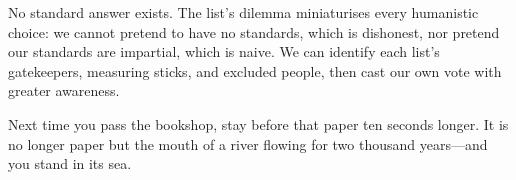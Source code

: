 No standard answer exists. The list's dilemma miniaturises every humanistic choice: we cannot pretend to have no standards, which is dishonest, nor pretend our standards are impartial, which is naive. We can identify each list's gatekeepers, measuring sticks, and excluded people, then cast our own vote with greater awareness.

Next time you pass the bookshop, stay before that paper ten seconds longer. It is no longer paper but the mouth of a river flowing for two thousand years---and you stand in its sea.

